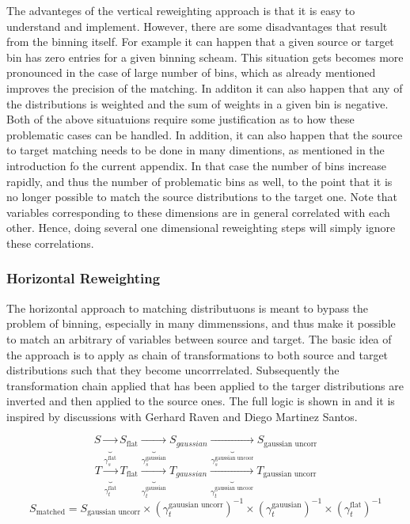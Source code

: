 The advanteges of the vertical reweighting approach is that it is easy to understand and implement.
However, there are some disadvantages that result from the binning itself. For example it can happen
that a given source or target bin has zero entries for a given binning scheam. This situation gets
becomes more pronounced in the case of large number of bins, which as already mentioned improves the
precision of the matching. In additon it can also happen that any of the distributions is weighted and
the sum of weights in a given bin is negative. Both of the above situatuions require some justification
as to how these problematic cases can be handled. In addition, it can also happen that the source to
target matching needs to be done in many dimentions, as mentioned in the introduction fo the current
appendix. In that case the number of bins increase rapidly, and thus the number of problematic bins as well,
to the point that it is no longer possible to match the source distributions to the target one.
Note that variables corresponding to these dimensions are in general correlated with each other.
Hence, doing several one dimensional reweighting steps will simply ignore these correlations.

\subsubsection{Horizontal Reweighting}
The horizontal approach to matching distributuons is meant to bypass the problem of binning, especially
in many dimmenssions, and thus make it possible to match an arbitrary of variables between source and target.
The basic idea of the approach is to apply as chain of transformations to both source and target distributions
such that they become uncorrrelated. Subsequently the transformation chain applied that has been applied to
the targer distributions are inverted and then applied to the source ones. The full logic is shown in \figref{}
and it is inspired by discussions with Gerhard Raven and Diego Martinez Santos.

\begin{equation}
 S \underbrace{\rightarrow}_{\gamma_s^{\text{flat}}}  S_\text{flat} \underbrace{\rightarrow}_{\gamma_s^{\text{gaussian}}} S_{gaussian} \underbrace{\rightarrow}_{\gamma_s^{\text{gaussian uncoor}}} S_\text{gaussian uncorr} \nonumber
\end{equation}
\begin{equation}
 T \underbrace{\rightarrow}_{\gamma_t^{\text{flat}}}  T_\text{flat} \underbrace{\rightarrow}_{\gamma_t^{\text{gaussian}}} T_{gaussian} \underbrace{\rightarrow}_{\gamma_t^{\text{gaussian uncoor}}} T_\text{gaussian uncorr} \nonumber
\end{equation}
\begin{equation}
S_\text{matched} = S_\text{gaussian uncorr} \times (\gamma_t^{\text{gauusian uncorr}})^{-1} \times (\gamma_t^{\text{gauusian}})^{-1} \times (\gamma_t^{\text{flat}})^{-1} \nonumber
\end{equation}

